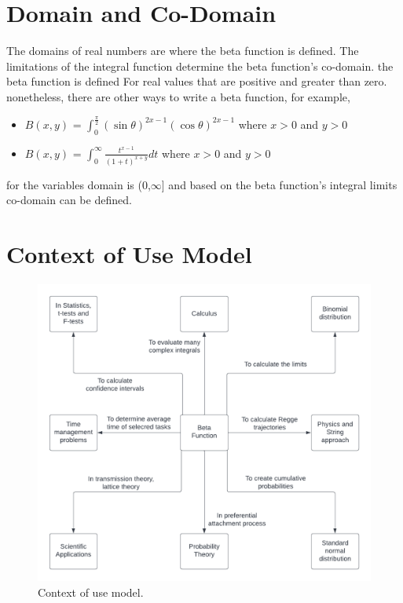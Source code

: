 \documentclass[a4paper, 12pt]{article}
\begin{document}
\section{Domain and Co-Domain}
The domains of real numbers are where the beta function is defined. The limitations of the integral function determine the beta function's co-domain. the beta function is defined For real values that are positive and greater than zero. nonetheless, there are other ways to write a beta function, for example, \\
    \begin{itemize}
        \item $B(x,y)$ = $\int_{0}^{\frac{\pi}{2}} (\sin \theta)^{2x-1} (\cos \theta)^{2x-1}$ where $x>0$ and $y>0$
        \item $B(x,y)$ = $\int_{0}^{\infty} \frac{t^{x-1}}{(1+t)^{x+y}} dt$  where $x>0$ and $y>0$
    \end{itemize}
for the variables domain is (0,${\infty}$] and based on the beta function's integral limits co-domain can be defined.\\

\newpage
\section*{Context of Use Model}

\begin{figure}[h]
    \centering
    \begin{center}
    \includegraphics[width=1.0\linewidth]{Images/beta_contextmodel.png}    
    \end{center}
    \caption{Context of use model.}
    \label{fig:Context of Use Model.}
\end{figure}
\end{document}
